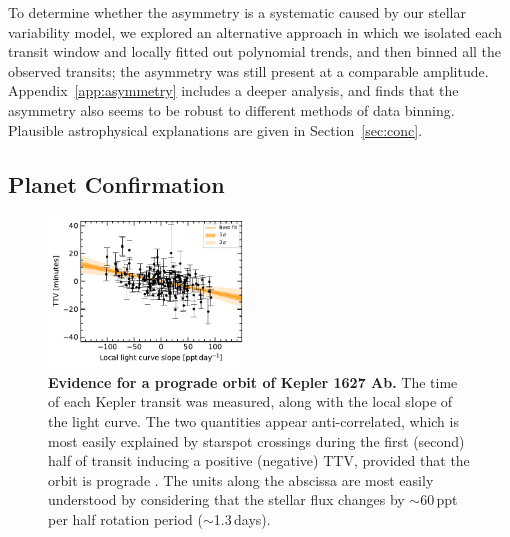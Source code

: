 \documentclass[12pt,modern,twocolumn,tighten]{aastex63}
\begin{document}
To determine whether the asymmetry is a systematic caused by our stellar variability model,
we explored an alternative
approach in which we isolated each transit window and locally fitted
out polynomial trends, and then binned all the observed transits; the
asymmetry was still present at a comparable amplitude.  
Appendix~\ref{app:asymmetry} includes a deeper analysis, and
finds that the asymmetry also seems to be robust to different methods of
data binning.  Plausible astrophysical explanations are given in
Section~\ref{sec:conc}.


\subsection{Planet Confirmation}


\begin{figure}[tp]
	\begin{center}
		\leavevmode
		\includegraphics[width=0.47\textwidth]{f4a.pdf}
	\end{center}
	\vspace{-0.7cm}
	\caption{
		{\bf Evidence for a prograde orbit of Kepler 1627 Ab.}
		The time of each Kepler transit was measured, along with the local
		slope of the light curve.  The two quantities appear
		anti-correlated, which is most easily explained by starspot
		crossings during the first (second) half of transit inducing a
		positive (negative) TTV, provided that the orbit is prograde
		\citep{mazeh_time_2015}.  The units along the abscissa are most
		easily understood by considering that the stellar flux changes by
		$\sim$60\,ppt per half rotation period ($\sim$1.3\,days).
		\label{fig:corr}
	}
\end{figure}

\end{document}
